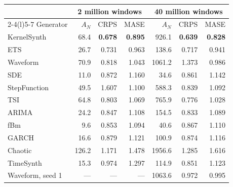 \begin{tabular}{@{}lrrrrrr@{}}
\toprule
 & \multicolumn{3}{c}{2 million windows} & \multicolumn{3}{c}{40 million windows}\\
\cmidrule(lr){2-4}\cmidrule(l){5-7}
Generator & $A_N$ & CRPS & MASE & $A_N$ & CRPS & MASE\\
\midrule
KernelSynth & 68.4 & \textbf{0.678} & \textbf{0.895} & 926.1 & \textbf{0.639} & \textbf{0.828} \\
ETS & 26.7 & 0.731 & 0.963 & 138.6 & 0.717 & 0.941 \\
Waveform & 70.9 & 0.818 & 1.043 & 1061.2 & 1.373 & 0.986 \\
SDE & 11.0 & 0.872 & 1.160 & 34.6 & 0.861 & 1.142 \\
StepFunction & 49.5 & 1.607 & 1.100 & 588.3 & 0.839 & 1.092 \\
TSI & 64.8 & 0.803 & 1.069 & 765.9 & 0.776 & 1.028 \\
ARIMA & 24.2 & 0.847 & 1.108 & 154.5 & 0.833 & 1.089 \\
fBm & 9.6 & 0.853 & 1.094 & 40.6 & 0.867 & 1.110 \\
GARCH & 16.6 & 0.879 & 1.121 & 100.9 & 0.874 & 1.116 \\
Chaotic & 126.2 & 1.171 & 1.478 & 1956.6 & 1.285 & 1.616 \\
TimeSynth & 15.3 & 0.974 & 1.297 & 114.9 & 0.851 & 1.123 \\
\midrule
Waveform, seed 1 & --- & --- & --- & 1063.6 & 0.972 & 0.995 \\
\bottomrule
\end{tabular}
